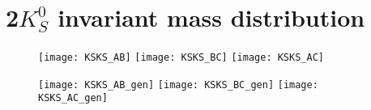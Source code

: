 \chapter{2$K_S^0$ invariant mass distribution}
\begin{figure}[H]
\begin{minipage}[b]{0.45\linewidth}
\centering
\texttt{[image: KSKS\_AB]}
\texttt{[image: KSKS\_BC]}
\texttt{[image: KSKS\_AC]}
\end{minipage}
\begin{minipage}[b]{0.45\linewidth}
\centering
\texttt{[image: KSKS\_AB\_gen]}
\texttt{[image: KSKS\_BC\_gen]}
\texttt{[image: KSKS\_AC\_gen]}
\end{minipage}
\end{figure}
